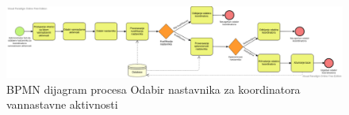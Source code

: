 \documentclass{article}
\begin{document}
\begin{landscape}
\begin{figure} [!ht]
    \begin{center}
        \includegraphics[scale=0.4]{imgs/BPMN_odabir_koordinatora.png}
    \end{center}
\caption{BPMN dijagram procesa Odabir nastavnika za koordinatora vannastavne aktivnosti}
\end{figure}
\end{landscape}
\end{document}
